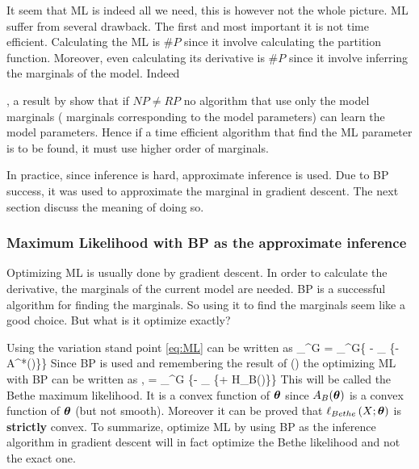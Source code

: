 It seem that ML is indeed all we need, this is however not the whole picture.
ML suffer from several drawback.
The first and most important it is not time efficient.
Calculating the ML is $\#P$ since it involve calculating the partition function.
Moreover, even calculating its derivative is $\#P$ since it involve inferring the marginals of the model.
Indeed , a result by \cite{bresler2014hardness,montanari2015computational} show that if $NP \neq RP$ no algorithm that use only the model marginals ( marginals corresponding to the model parameters) can learn the model parameters. 
Hence if a time efficient algorithm that find the ML parameter is to be found, it must use higher order of marginals.

In practice, since inference is hard, approximate inference is used.
Due to BP success, it was used to approximate the marginal in gradient descent.
The next section discuss the meaning of doing so.
\subsubsection{Maximum Likelihood with BP as the approximate inference}
\label{sec:Bethe_ML}
Optimizing ML is usually done by gradient descent.
In order to calculate the derivative, the marginals of the current model are needed.
BP is a successful algorithm for finding the marginals.
So using it to find the marginals seem like a good choice.
But what is it optimize exactly?

Using the variation stand point \eqref{eq:ML} can be written as
\be
\sup_{\thetav \in \Omega^G}  = \sup_{\thetav \in \Omega^G}\left\{ \mubv \cdot \thetav - \sup_{\muv \in \margpoly} \left\{\muv \cdot \thetav - A^*(\muv)\right\}\right\}
\ee
Since BP is used and remembering the result of \cite{yedidia2000generalized}() the optimizing ML with BP can be written as ,
\be
\label{eq:bethe_like}
  = \sup_{\thetav \in \Omega^G} \left\{\mubv \cdot \thetav - \sup_{\tauv \in \lclmargpoly} \left\{\tauv \cdot \thetav + H_B(\tauv)\right\}\right\}
\ee
This will be called the Bethe maximum likelihood.
It is a convex function of $\boldsymbol{\theta}$ since $A_B(\boldsymbol{\theta})$ is a convex function of $\boldsymbol{\theta}$ (but not smooth).
Moreover it can be proved that $\ell_{Bethe}\left(X; \boldsymbol{\theta}\right)$ is \textbf{strictly} convex. %
To summarize, optimize ML by using BP as the inference algorithm in gradient descent will in fact optimize the Bethe likelihood and not the exact one.

